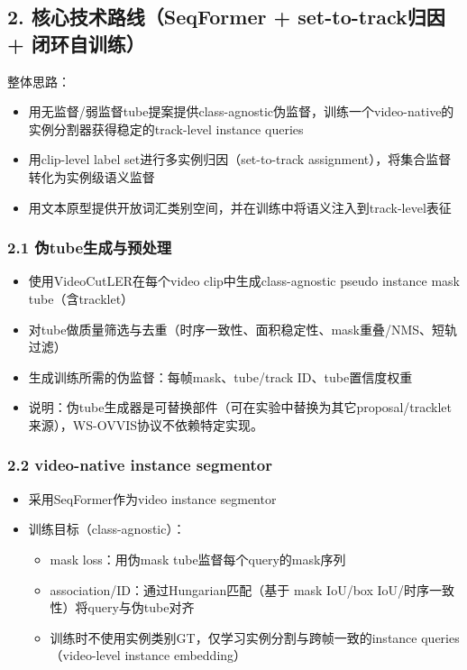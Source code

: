 \documentclass[UTF8]{ctexart}
\begin{document}
\par\noindent\hrulefill\par


\subsection*{2. 核心技术路线（SeqFormer + set-to-track归因 + 闭环自训练）}
整体思路：
\begin{itemize}
\item 用无监督/弱监督tube提案提供class-agnostic伪监督，训练一个video-native的实例分割器获得稳定的track-level instance queries
\item 用clip-level label set进行多实例归因（set-to-track assignment），将集合监督转化为实例级语义监督
\item 用文本原型提供开放词汇类别空间，并在训练中将语义注入到track-level表征
\end{itemize}

\subsubsection*{2.1 伪tube生成与预处理}
\begin{itemize}
\item 使用VideoCutLER在每个video clip中生成class-agnostic pseudo instance mask tube（含tracklet）
\item 对tube做质量筛选与去重（时序一致性、面积稳定性、mask重叠/NMS、短轨过滤）
\item 生成训练所需的伪监督：每帧mask、tube/track ID、tube置信度权重
\item 说明：伪tube生成器是可替换部件（可在实验中替换为其它proposal/tracklet来源），WS-OVVIS协议不依赖特定实现。
\end{itemize}

\subsubsection*{2.2 video-native instance segmentor}
\begin{itemize}
\item 采用SeqFormer作为video instance segmentor
\item 训练目标（class-agnostic）：
\begin{itemize}
\item mask loss：用伪mask tube监督每个query的mask序列
\item association/ID：通过Hungarian匹配（基于 mask IoU/box IoU/时序一致性）将query与伪tube对齐
\item 训练时不使用实例类别GT，仅学习实例分割与跨帧一致的instance queries（video-level instance embedding）
\end{itemize}
\end{itemize}
\end{document}
